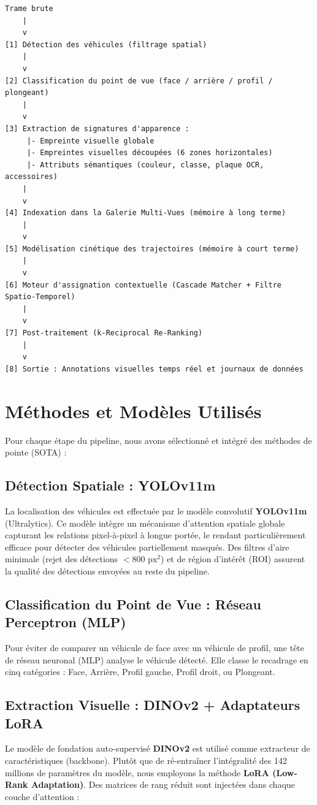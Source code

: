 \documentclass[12pt, a4paper]{article}
\begin{document}
\begin{verbatim}
Trame brute
    |
    v
[1] Détection des véhicules (filtrage spatial)
    |
    v
[2] Classification du point de vue (face / arrière / profil / plongeant)
    |
    v
[3] Extraction de signatures d'apparence :
     |- Empreinte visuelle globale
     |- Empreintes visuelles découpées (6 zones horizontales)
     |- Attributs sémantiques (couleur, classe, plaque OCR, accessoires)
    |
    v
[4] Indexation dans la Galerie Multi-Vues (mémoire à long terme)
    |
    v
[5] Modélisation cinétique des trajectoires (mémoire à court terme)
    |
    v
[6] Moteur d'assignation contextuelle (Cascade Matcher + Filtre Spatio-Temporel)
    |
    v
[7] Post-traitement (k-Reciprocal Re-Ranking)
    |
    v
[8] Sortie : Annotations visuelles temps réel et journaux de données
\end{verbatim}

\section{Méthodes et Modèles Utilisés}

Pour chaque étape du pipeline, nous avons sélectionné et intégré des méthodes de pointe (SOTA) :

\subsection{Détection Spatiale : YOLOv11m}
La localisation des véhicules est effectuée par le modèle convolutif \textbf{YOLOv11m} (Ultralytics). Ce modèle intègre un mécanisme d'attention spatiale globale capturant les relations pixel-à-pixel à longue portée, le rendant particulièrement efficace pour détecter des véhicules partiellement masqués. Des filtres d'aire minimale (rejet des détections $< 800 \text{ px}^2$) et de région d'intérêt (ROI) assurent la qualité des détections envoyées au reste du pipeline.

\subsection{Classification du Point de Vue : Réseau Perceptron (MLP)}
Pour éviter de comparer un véhicule de face avec un véhicule de profil, une tête de réseau neuronal (MLP) analyse le véhicule détecté. Elle classe le recadrage en cinq catégories : Face, Arrière, Profil gauche, Profil droit, ou Plongeant.

\subsection{Extraction Visuelle : DINOv2 + Adaptateurs LoRA}
Le modèle de fondation auto-supervisé \textbf{DINOv2} est utilisé comme extracteur de caractéristiques (backbone). Plutôt que de ré-entraîner l'intégralité des 142 millions de paramètres du modèle, nous employons la méthode \textbf{LoRA (Low-Rank Adaptation)}. Des matrices de rang réduit sont injectées dans chaque couche d'attention :
\end{document}
